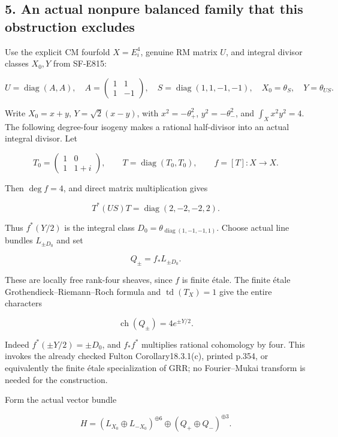 \subsection{5. An actual nonpure balanced family that this obstruction
excludes}\label{SF-E819-an-actual-nonpure-balanced-family-that-this-obstruction-excludes}

Use the explicit CM fourfold \(X=E_i^4\), genuine RM matrix \(U\), and
integral divisor classes \(X_0,Y\) from SF-E815:

\[
 U=\operatorname{diag}(A,A),\quad
 A=\begin{pmatrix}1&1\\1&-1\end{pmatrix},\quad
 S=\operatorname{diag}(1,1,-1,-1),\quad
 X_0=\theta_S,\quad Y=\theta_{US}.
\]

Write \(X_0=x+y\), \(Y=\sqrt2(x-y)\), with \(x^2=-\theta_+^2\),
\(y^2=-\theta_-^2\), and \(\int_Xx^2y^2=4\). The following degree-four
isogeny makes a rational half-divisor into an actual integral divisor.
Let

\[
 T_0=\begin{pmatrix}1&0\\1&1+i\end{pmatrix},\qquad
 T=\operatorname{diag}(T_0,T_0),\qquad f=[T]:X\to X.
\]

Then \(\deg f=4\), and direct matrix multiplication gives

\[
 T^*(US)T=\operatorname{diag}(2,-2,-2,2).
 \tag{E819.14}
\]

Thus \(f^*(Y/2)\) is the integral class
\(D_0=\theta_{\operatorname{diag}(1,-1,-1,1)}\). Choose actual line
bundles \(L_{\pm D_0}\) and set

\[
 Q_\pm=f_*L_{\pm D_0}.
\]

These are locally free rank-four sheaves, since \(f\) is finite étale.
The finite étale Grothendieck--Riemann--Roch formula and
\(\operatorname{td}(T_X)=1\) give the entire characters

\[
 \operatorname{ch}(Q_\pm)=4e^{\pm Y/2}.
 \tag{E819.15}
\]

Indeed \(f^*(\pm Y/2)=\pm D_0\), and \(f_*f^*\) multiplies rational
cohomology by four. This invokes the already checked Fulton
Corollary18.3.1(c), printed p.354, or equivalently the finite étale
specialization of GRR; no Fourier--Mukai transform is needed for the
construction.

Form the actual vector bundle

\[
 H=(L_{X_0}\oplus L_{-X_0})^{\oplus6}
            \oplus(Q_+\oplus Q_-)^{\oplus3}.
 \tag{E819.16}
\]

